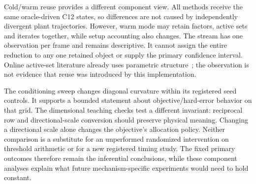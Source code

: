 Cold/warm reuse provides a different component view. All methods
receive the same oracle-driven C12 states, so differences are not
caused by independently divergent plant trajectories. However,
warm mode may retain factors, active sets and iterates together,
while setup accounting also changes. The stream has one observation
per frame and remains descriptive. It cannot assign the entire
reduction to any one retained object or supply the primary
confidence interval. Online active-set literature already uses
parametric structure~\cite{qpOASES}; the observation is not evidence
that reuse was introduced by this implementation.

The conditioning sweep changes diagonal curvature within its
registered seed controls. It supports a bounded statement about
objective/hard-error behavior on that grid. The dimensional
teaching checks test a different invariant: reciprocal row and
directional-scale conversion should preserve physical meaning.
Changing a directional scale alone changes the objective's
allocation policy. Neither comparison is a substitute for an
unperformed randomized intervention on threshold arithmetic or
for a new registered timing study. The fixed primary outcomes
therefore remain the inferential conclusions, while these
component analyses explain what future mechanism-specific
experiments would need to hold constant.
